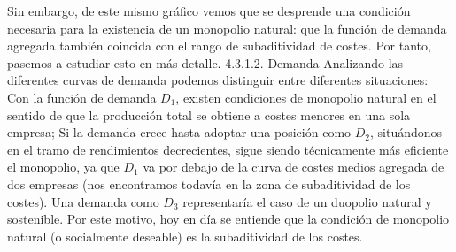 \documentclass[10pt,a4paper]{article}
\begin{document}
Sin embargo, de este mismo gráfico vemos que se desprende una condición necesaria para la existencia de un monopolio natural: que la función de demanda agregada también coincida con el rango de subaditividad de costes. Por tanto, pasemos a estudiar esto en más detalle.
4.3.1.2. Demanda
Analizando las diferentes curvas de demanda podemos distinguir entre diferentes situaciones:
	Con la función de demanda $D_1$, existen condiciones de monopolio natural en el sentido de que la producción total se obtiene a costes menores en una sola empresa;
	Si la demanda crece hasta adoptar una posición como $D_2$, situándonos en el tramo de rendimientos decrecientes, sigue siendo técnicamente más eficiente el monopolio, ya que $D_1$ va por debajo de la curva de costes medios agregada de dos empresas (nos encontramos todavía en la zona de subaditividad de los costes).
	Una demanda como $D_3$ representaría el caso de un duopolio natural y sostenible.  
Por este motivo, hoy en día se entiende que la condición de monopolio natural (o socialmente deseable) es la subaditividad de los costes. 
\end{document}
